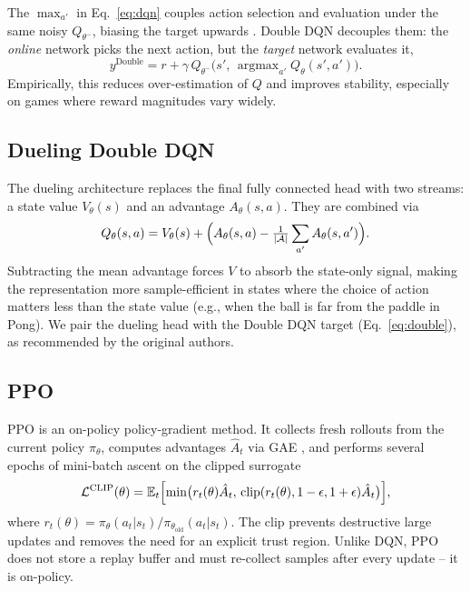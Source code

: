 \documentclass[12pt]{article}
\begin{document}
The $\max_{a'}$ in Eq.~\ref{eq:dqn} couples action selection and
evaluation under the same noisy $Q_{\theta^{-}}$, biasing the target
upwards \citep{vanhasselt2016deep}. Double DQN decouples them: the
\emph{online} network picks the next action, but the \emph{target} network
evaluates it,
\begin{equation}
y^{\text{Double}} = r + \gamma\, Q_{\theta^{-}}\!\bigl(s',\,\operatorname{argmax}_{a'}Q_{\theta}(s',a')\bigr).
\label{eq:double}
\end{equation}
Empirically, this reduces over-estimation of $Q$ and improves stability,
especially on games where reward magnitudes vary widely.

\subsection{Dueling Double DQN}

The dueling architecture \citep{wang2016dueling} replaces the final
fully connected head with two streams: a state value $V_{\theta}(s)$ and an
advantage $A_{\theta}(s,a)$. They are combined via
\begin{equation}
Q_{\theta}(s,a) = V_{\theta}(s) + \Bigl(A_{\theta}(s,a) - \tfrac{1}{|\mathcal{A}|}\sum_{a'}A_{\theta}(s,a')\Bigr).
\label{eq:dueling}
\end{equation}
Subtracting the mean advantage forces $V$ to absorb the state-only signal,
making the representation more sample-efficient in states where the choice
of action matters less than the state value (e.g., when the ball is far from
the paddle in Pong). We pair the dueling head with the Double DQN target
(Eq.~\ref{eq:double}), as recommended by the original authors.

\subsection{PPO}

PPO \citep{schulman2017proximal} is an on-policy policy-gradient method.
It collects fresh rollouts from the current policy $\pi_{\theta}$, computes
advantages $\hat{A}_{t}$ via GAE \citep{schulman2016highdim}, and performs
several epochs of mini-batch ascent on the clipped surrogate
\begin{equation}
\mathcal{L}^{\text{CLIP}}(\theta) = \mathbb{E}_{t}\Bigl[\min\bigl(r_{t}(\theta)\hat{A}_{t},\,\operatorname{clip}(r_{t}(\theta),1-\epsilon,1+\epsilon)\hat{A}_{t}\bigr)\Bigr],
\label{eq:ppo}
\end{equation}
where $r_{t}(\theta) = \pi_{\theta}(a_{t}|s_{t})/\pi_{\theta_{\text{old}}}(a_{t}|s_{t})$.
The clip prevents destructive large updates and removes the need for an
explicit trust region. Unlike DQN, PPO does not store a replay buffer and
must re-collect samples after every update -- it is on-policy.
\end{document}
